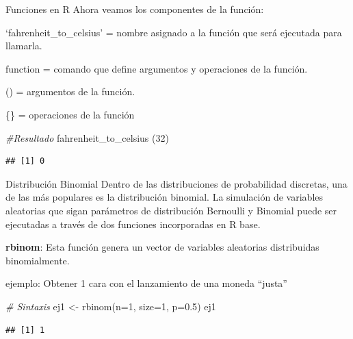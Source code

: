 \documentclass[
  8pt,
  ignorenonframetext,
]{beamer}
\newenvironment{Shaded}{\begin{snugshade}}{\end{snugshade}}
\newcommand{\AttributeTok}[1]{\textcolor[rgb]{0.77,0.63,0.00}{#1}}
\newcommand{\CommentTok}[1]{\textcolor[rgb]{0.56,0.35,0.01}{\textit{#1}}}
\newcommand{\DecValTok}[1]{\textcolor[rgb]{0.00,0.00,0.81}{#1}}
\newcommand{\FloatTok}[1]{\textcolor[rgb]{0.00,0.00,0.81}{#1}}
\newcommand{\FunctionTok}[1]{\textcolor[rgb]{0.00,0.00,0.00}{#1}}
\newcommand{\NormalTok}[1]{#1}
\newcommand{\OtherTok}[1]{\textcolor[rgb]{0.56,0.35,0.01}{#1}}
\begin{document}
\begin{frame}[fragile]{Funciones en R}
\protect\hypertarget{funciones-en-r-2}{}
Ahora veamos los componentes de la función:

`fahrenheit\_to\_celsius' = nombre asignado a la función que será
ejecutada para llamarla.

function = comando que define argumentos y operaciones de la función.

() = argumentos de la función.

\{\} = operaciones de la función

\begin{Shaded}
\begin{Highlighting}[]
\CommentTok{\#Resultado}
\FunctionTok{fahrenheit\_to\_celsius}\NormalTok{ (}\DecValTok{32}\NormalTok{)}
\end{Highlighting}
\end{Shaded}

\begin{verbatim}
## [1] 0
\end{verbatim}
\end{frame}

\begin{frame}[fragile]{Distribución Binomial}
\protect\hypertarget{distribuciuxf3n-binomial}{}
Dentro de las distribuciones de probabilidad discretas, una de las más
populares es la distribución binomial. La simulación de variables
aleatorias que sigan parámetros de distribución Bernoulli y Binomial
puede ser ejecutadas a través de dos funciones incorporadas en R base.

\textbf{rbinom}: Esta función genera un vector de variables aleatorias
distribuidas binomialmente.

ejemplo: Obtener 1 cara con el lanzamiento de una moneda ``justa''

\begin{Shaded}
\begin{Highlighting}[]
\CommentTok{\# Sintaxis}
\NormalTok{ej1 }\OtherTok{\textless{}{-}} \FunctionTok{rbinom}\NormalTok{(}\AttributeTok{n=}\DecValTok{1}\NormalTok{, }\AttributeTok{size=}\DecValTok{1}\NormalTok{, }\AttributeTok{p=}\FloatTok{0.5}\NormalTok{)}
\NormalTok{ej1}
\end{Highlighting}
\end{Shaded}

\begin{verbatim}
## [1] 1
\end{verbatim}
\end{frame}
\end{document}
